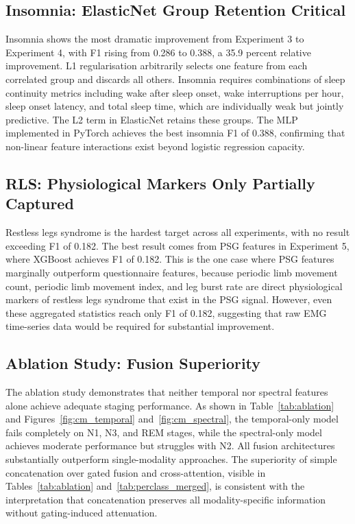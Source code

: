 \subsection{Insomnia: ElasticNet Group Retention Critical}

Insomnia shows the most dramatic improvement from Experiment 3 to Experiment 4, with F1 rising from 0.286 to 0.388, a 35.9 percent relative improvement. L1 regularisation arbitrarily selects one feature from each correlated group and discards all others. Insomnia requires combinations of sleep continuity metrics including wake after sleep onset, wake interruptions per hour, sleep onset latency, and total sleep time, which are individually weak but jointly predictive. The L2 term in ElasticNet retains these groups. The MLP implemented in PyTorch achieves the best insomnia F1 of 0.388, confirming that non-linear feature interactions exist beyond logistic regression capacity.

\subsection{RLS: Physiological Markers Only Partially Captured}

Restless legs syndrome is the hardest target across all experiments, with no result exceeding F1 of 0.182. The best result comes from PSG features in Experiment 5, where XGBoost achieves F1 of 0.182. This is the one case where PSG features marginally outperform questionnaire features, because periodic limb movement count, periodic limb movement index, and leg burst rate are direct physiological markers of restless legs syndrome that exist in the PSG signal. However, even these aggregated statistics reach only F1 of 0.182, suggesting that raw EMG time-series data would be required for substantial improvement.

\subsection{Ablation Study: Fusion Superiority}

The ablation study demonstrates that neither temporal nor spectral features alone achieve adequate staging performance. As shown in Table~\ref{tab:ablation} and Figures~\ref{fig:cm_temporal} and~\ref{fig:cm_spectral}, the temporal-only model fails completely on N1, N3, and REM stages, while the spectral-only model achieves moderate performance but struggles with N2. All fusion architectures substantially outperform single-modality approaches. The superiority of simple concatenation over gated fusion and cross-attention, visible in Tables~\ref{tab:ablation} and~\ref{tab:perclass_merged}, is consistent with the interpretation that concatenation preserves all modality-specific information without gating-induced attenuation.

